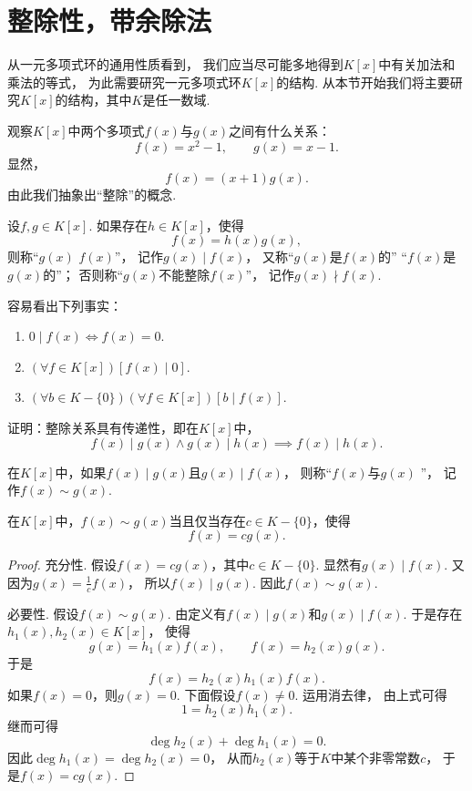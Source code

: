 \section{整除性，带余除法}
从一元多项式环的通用性质看到，
我们应当尽可能多地得到\(K[x]\)中有关加法和乘法的等式，
为此需要研究一元多项式环\(K[x]\)的结构.
从本节开始我们将主要研究\(K[x]\)的结构，其中\(K\)是任一数域.

观察\(K[x]\)中两个多项式\(f(x)\)与\(g(x)\)之间有什么关系：\[
	f(x)=x^2-1, \qquad
	g(x)=x-1.
\]
显然，\[
	f(x)=(x+1) g(x).
\]
由此我们抽象出“整除”的概念.

\begin{definition}
设\(f,g \in K[x]\).
如果存在\(h \in K[x]\)，使得\[
	f(x) = h(x) g(x),
\]
则称“\(g(x)\)  \(f(x)\)”，
记作\(g(x) \mid f(x)\)，
又称“\(g(x)\)是\(f(x)\)的”
“\(f(x)\)是\(g(x)\)的”；
否则称“\(g(x)\)不能整除\(f(x)\)”，
记作\(g(x) \nmid f(x)\).
\end{definition}

容易看出下列事实：
\begin{enumerate}
	\item \(0 \mid f(x) \iff f(x) = 0\).
	\item \((\forall f \in K[x])[f(x) \mid 0]\).
	\item \((\forall b \in K - \{0\})(\forall f \in K[x])[b \mid f(x)]\).
\end{enumerate}

\begin{example}
证明：整除关系具有传递性，即在\(K[x]\)中，\[
	f(x) \mid g(x) \land g(x) \mid h(x)
	\implies
	f(x) \mid h(x).
\]
\end{example}

\begin{definition}
在\(K[x]\)中，如果\(f(x) \mid g(x)\)且\(g(x) \mid f(x)\)，
则称“\(f(x)\)与\(g(x)\) ”，
记作\(f(x) \sim g(x)\).
\end{definition}

\begin{proposition}
在\(K[x]\)中，\(f(x) \sim g(x)\)当且仅当存在\(c \in K-\{0\}\)，使得\[
	f(x) = c g(x).
\]
\begin{proof}
充分性.
假设\(f(x)=c g(x)\)，其中\(c \in K-\{0\}\).
显然有\(g(x) \mid f(x)\).
又因为\(g(x)=\frac1c f(x)\)，
所以\(f(x) \mid g(x)\).
因此\(f(x) \sim g(x)\).

必要性.
假设\(f(x) \sim g(x)\).
由定义有\(f(x) \mid g(x)\)和\(g(x) \mid f(x)\).
于是存在\(h_1(x),h_2(x) \in K[x]\)，
使得\[
	g(x) = h_1(x) f(x), \qquad
	f(x) = h_2(x) g(x).
\]
于是\[
	f(x) = h_2(x) h_1(x) f(x).
\]
如果\(f(x)=0\)，则\(g(x)=0\).
下面假设\(f(x)\neq0\).
运用消去律，
由上式可得\[
	1 = h_2(x) h_1(x).
\]
继而可得\[
	\deg h_2(x) + \deg h_1(x) = 0.
\]
因此\(\deg h_1(x) = \deg h_2(x) = 0\)，
从而\(h_2(x)\)等于\(K\)中某个非零常数\(c\)，
于是\(f(x) = c g(x)\).
\end{proof}
\end{proposition}

